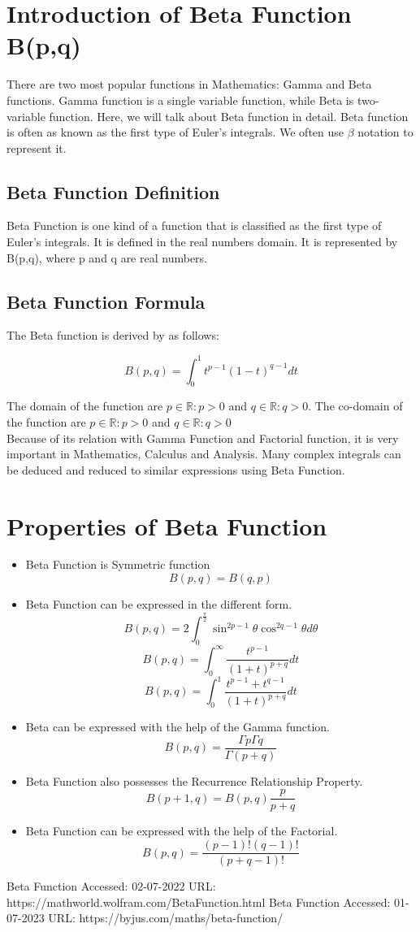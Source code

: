 \documentclass[12pt,letterpaper]{article}
\begin{document}
\section{Introduction of Beta Function B(p,q)}
There are two most popular functions in Mathematics: Gamma and Beta functions. Gamma function is a single variable function, while Beta is two-variable function. Here, we will talk about Beta function in detail. Beta function is often as known as the first type of Euler's integrals. We often use $\beta$ notation to represent it.

\subsection{Beta Function Definition}
Beta Function is one kind of a function that is classified as the first type of Euler's integrals. It is defined in the real numbers domain. It is represented by B(p,q), where p and q are real numbers.

\subsection{Beta Function Formula}
The Beta function is derived by as follows:\cite{BetaFunctionIntroduction}

\[B(p,q)=\int_{0}^{1} t^{p-1} {(1-t)}^{q-1} dt\]

The domain of the function are $p \in \mathbb R: p > 0$ and $q \in \mathbb R : q > 0$. The co-domain of the function are $p \in \mathbb R: p > 0$ and $q \in \mathbb R : q > 0$\\
Because of its relation with Gamma Function and Factorial function, it is very important in Mathematics, Calculus and Analysis. Many complex integrals can be deduced and reduced to similar expressions using Beta Function.

\section{Properties of Beta Function}
\begin{itemize}
    \item Beta Function is Symmetric function \[B(p,q) = B(q,p)\]
    \item Beta Function can be expressed in the different form.\cite{BetaFunctionForms}
    \[B(p,q) = 2 \int_{0}^{\frac{\pi}{2}} \sin^{2p-1} \theta \cos^{2q-1} \theta d\theta\]
    \[B(p,q) = \int_{0}^{\infty} \frac{t^{p-1}}{(1+t)^{p+q}} dt\]
    \[B(p,q) = \int_{0}^{1} \frac{t^{p-1}+t^{q-1}}{(1+t)^{p+q}} dt\]
    \item Beta can be expressed with the help of the Gamma function.
    \[B(p,q) = \frac{\Gamma p \Gamma q}{\Gamma (p+q)}\]
    \item Beta Function also possesses the Recurrence Relationship Property.
    \[B(p+1,q) = B(p,q) \frac{p}{p+q}\]
    \item Beta Function can be expressed with the help of the Factorial.
    \[B(p,q) = \frac{(p-1)!(q-1)!}{(p+q-1)!}\]
\end{itemize}

\begin{thebibliography}{plain}
Beta Function Accessed: 02-07-2022 URL: https://mathworld.wolfram.com/BetaFunction.html
Beta Function Accessed: 01-07-2023 URL: https://byjus.com/maths/beta-function/
\end{thebibliography}
\end{document}

